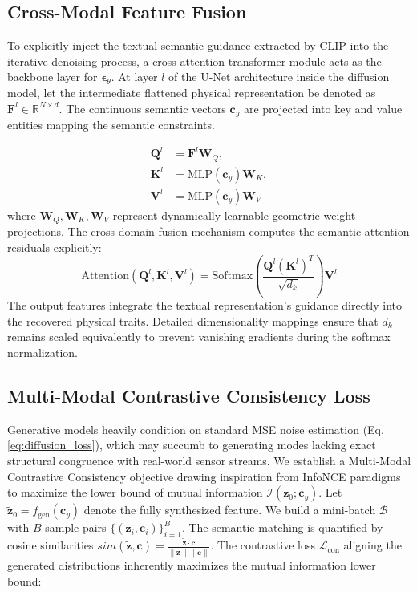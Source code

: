 \subsection{Cross-Modal Feature Fusion}
\label{subsec:cross_modal_fusion}

To explicitly inject the textual semantic guidance extracted by CLIP into the iterative denoising process, a cross-attention transformer module acts as the backbone layer for $\boldsymbol{\epsilon}_\theta$. At layer $l$ of the U-Net architecture inside the diffusion model, let the intermediate flattened physical representation be denoted as $\mathbf{F}^l \in \mathbb{R}^{N \times d}$. The continuous semantic vectors $\mathbf{c}_y$ are projected into key and value entities mapping the semantic constraints.

\begin{align}
\mathbf{Q}^l &= \mathbf{F}^l \mathbf{W}_Q, \label{eq:query} \\
\mathbf{K}^l &= \text{MLP}(\mathbf{c}_y) \mathbf{W}_K, \label{eq:key} \\
\mathbf{V}^l &= \text{MLP}(\mathbf{c}_y) \mathbf{W}_V \label{eq:value}
\end{align}
where $\mathbf{W}_Q, \mathbf{W}_K, \mathbf{W}_V$ represent dynamically learnable geometric weight projections. The cross-domain fusion mechanism computes the semantic attention residuals explicitly:
\begin{equation}\label{eq:cross_attention}
\text{Attention}(\mathbf{Q}^l, \mathbf{K}^l, \mathbf{V}^l) = \text{Softmax}\left( \frac{\mathbf{Q}^l (\mathbf{K}^l)^T}{\sqrt{d_k}} \right) \mathbf{V}^l
\end{equation}
The output features integrate the textual representation's guidance directly into the recovered physical traits. Detailed dimensionality mappings ensure that $d_k$ remains scaled equivalently to prevent vanishing gradients during the softmax normalization.

\subsection{Multi-Modal Contrastive Consistency Loss}
\label{subsec:contrastive_loss}

Generative models heavily condition on standard MSE noise estimation (Eq. \ref{eq:diffusion_loss}), which may succumb to generating modes lacking exact structural congruence with real-world sensor streams. We establish a Multi-Modal Contrastive Consistency objective drawing inspiration from InfoNCE paradigms to maximize the lower bound of mutual information $\mathcal{I}(\mathbf{z}_0; \mathbf{c}_y)$. Let $\tilde{\mathbf{z}}_0 = f_{\text{gen}}(\mathbf{c}_y)$ denote the fully synthesized feature. We build a mini-batch $\mathcal{B}$ with $B$ sample pairs $\{(\tilde{\mathbf{z}}_i, \mathbf{c}_i)\}_{i=1}^B$. The semantic matching is quantified by cosine similarities $sim(\tilde{\mathbf{z}}, \mathbf{c}) = \frac{\tilde{\mathbf{z}} \cdot \mathbf{c}}{\|\tilde{\mathbf{z}}\| \|\mathbf{c}\|}$. The contrastive loss $\mathcal{L}_{\text{con}}$ aligning the generated distributions inherently maximizes the mutual information lower bound:

